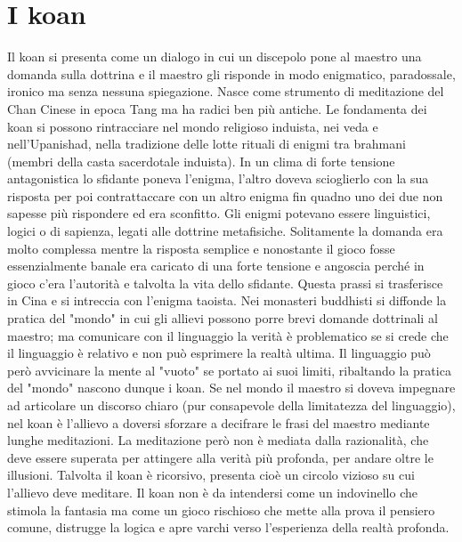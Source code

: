 \documentclass[10pt,a4paper]{report}
\begin{document}
\section{I koan} 
Il koan si presenta come un dialogo in cui un discepolo pone al maestro una domanda sulla dottrina e il maestro gli risponde in modo enigmatico, paradossale, ironico ma senza nessuna spiegazione. Nasce come strumento di meditazione del Chan Cinese in epoca Tang ma ha radici ben più antiche. Le fondamenta dei koan si possono rintracciare nel mondo religioso induista, nei veda e nell'Upanishad, nella tradizione delle lotte rituali di enigmi tra brahmani (membri della casta sacerdotale induista). In un clima di forte tensione antagonistica lo sfidante poneva l'enigma, l'altro doveva scioglierlo con la sua risposta per poi contrattaccare con un altro enigma fin quadno uno dei due non sapesse più rispondere ed era sconfitto. Gli enigmi potevano essere linguistici, logici o di sapienza, legati alle dottrine metafisiche. Solitamente la domanda era molto complessa mentre la risposta semplice e nonostante il gioco fosse essenzialmente banale era caricato di una forte tensione e angoscia perché in gioco c'era l'autorità e talvolta la vita dello sfidante. Questa prassi si trasferisce in Cina e si intreccia con l'enigma taoista. Nei monasteri buddhisti si diffonde la pratica del "mondo" in cui gli allievi possono porre brevi domande dottrinali al maestro; ma comunicare con il linguaggio la verità è problematico se si crede che il linguaggio è relativo e non può esprimere la realtà ultima. Il linguaggio può però avvicinare la mente al "vuoto" se portato ai suoi limiti, ribaltando la pratica del "mondo" nascono dunque i koan. Se nel mondo il maestro si doveva impegnare ad articolare un discorso chiaro (pur consapevole della limitatezza del linguaggio), nel koan è l'allievo a doversi sforzare a decifrare le frasi del maestro mediante lunghe meditazioni. La meditazione però non è mediata dalla razionalità, che deve essere superata per attingere alla verità più profonda, per andare oltre le illusioni. Talvolta il koan è ricorsivo, presenta cioè un circolo vizioso su cui l'allievo deve meditare. Il koan non è da intendersi come un indovinello che stimola la fantasia ma come un gioco rischioso che mette alla prova il pensiero comune, distrugge la logica e apre varchi verso l'esperienza della realtà profonda.  
\end{document}
